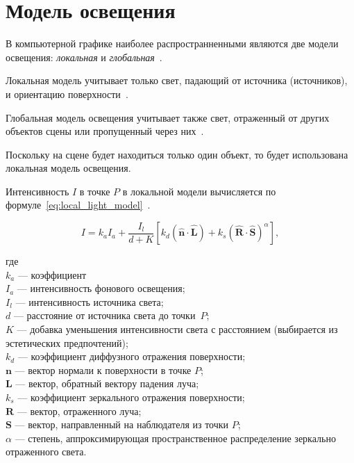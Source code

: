     \section{Модель освещения}
    
    В компьютерной графике наиболее распространненными являются две модели освещения: \textit{локальная} и \textit{глобальная}~\cite{rogers}.
    
    Локальная модель учитывает только свет, падающий от источника (источников), и ориентацию поверхности~\cite{rogers}.
    
    Глобальная модель освещения учитывает также свет, отраженный от других объектов сцены или пропущенный через них~\cite{rogers}.
    
    Поскольку на сцене будет находиться только один объект, то будет использована локальная модель освещения.
    
    Интенсивность $I$ в точке $P$ в локальной модели вычисляется по формуле~\eqref{eq:local_light_model}~\cite{rogers}.
    
    \begin{equation}
    	\label{eq:local_light_model}
    	I = k_aI_a + \frac{I_l}{d + K}[k_d(\mathbf{\hat{n}\cdot \hat{L}})+k_s(\mathbf{\hat{R}\cdot \hat{S}})^\alpha],
    \end{equation}
    
    где \\
    $k_a$ --- коэффициент \\
    $I_a$ --- интенсивность фонового освещения; \\
    $I_l$ --- интенсивность источника света; \\
    $d$ --- расстояние от источника света до точки~$P$; \\
    $K$ --- добавка уменьшения интенсивности света с расстоянием (выбирается из эстетических предпочтений); \\
    $k_d$ --- коэффициент диффузного отражения поверхности; \\
    $\mathbf{n}$ --- вектор нормали к поверхности в точке $P$; \\
    $\mathbf{L}$ --- вектор, обратный вектору падения луча; \\
    $k_s$ --- коэффициент зеркального отражения поверхности; \\
    $\mathbf{R}$ --- вектор, отраженного луча; \\
    $\mathbf{S}$ --- вектор, направленный на наблюдателя из точки $P$; \\
    $\alpha$ --- степень, аппроксимирующая пространственное распределение зеркально отраженного света.
        
